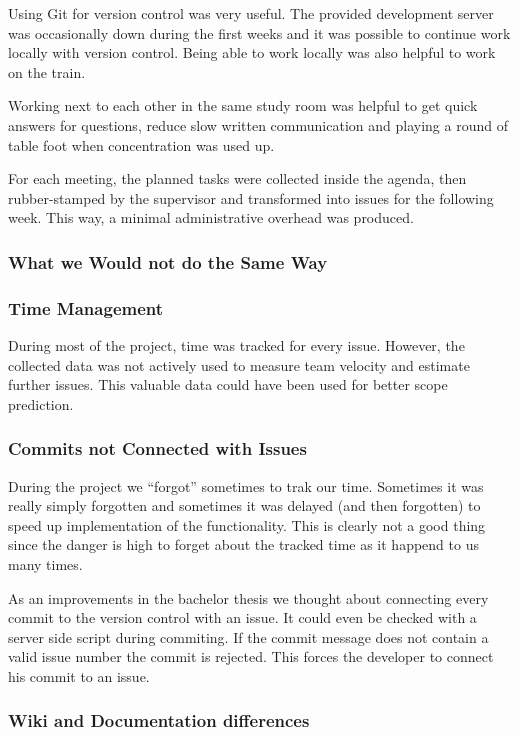 Using Git\cite{GIT} for
version 
control was very useful. The provided development server was occasionally down 
during the first weeks and it was possible to continue work locally with version
control. Being able to work locally was also helpful to work on the train. 

Working next to each other in the same study room was helpful to get quick 
answers for questions, reduce slow written communication and playing a round of 
table foot when concentration was used up.

For each meeting, the planned tasks were collected inside the agenda, then 
rubber-stamped by the supervisor and transformed into issues for the following 
week. This way, a minimal administrative overhead was produced.

\subsubsection{What we Would not do the Same Way}

\subsubsection*{Time Management}
During most of the project, time was tracked for every issue. 
However, the collected data was not actively used to measure team velocity and 
estimate further issues. This valuable data could have been used for better 
scope prediction.

\subsubsection*{Commits not Connected with Issues}

During the project we ``forgot'' sometimes to trak our time. Sometimes it was
really simply forgotten and sometimes it was delayed (and then forgotten) to
speed up implementation of the functionality. This is clearly not a good thing
since the danger is high to forget about the tracked time as it happend to us
many times.

As an improvements in the bachelor thesis we thought about connecting every
commit to the version control with an issue. It could even be checked with a
server side script during commiting. If the commit message does not contain a
valid issue number the commit is rejected. This forces the developer to connect
his commit to an issue.

\subsubsection*{Wiki and Documentation differences}


